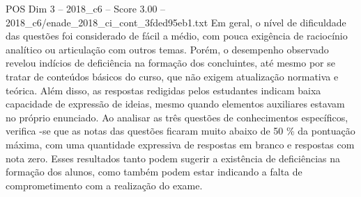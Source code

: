 \begin{textsample}{POS Dim 3 – 2018\_c6 – Score 3.00 – 2018\_c6/enade\_2018\_ci\_cont\_3fded95eb1.txt}
Em geral, o nível de dificuldade das questões foi considerado de fácil a médio, com pouca exigência de raciocínio analítico ou articulação com outros temas.
Porém, o desempenho observado revelou indícios de deficiência na formação dos concluintes, até mesmo por se tratar de conteúdos básicos do curso, que não exigem atualização normativa e teórica.
Além disso, as respostas redigidas pelos estudantes indicam baixa capacidade de expressão de ideias, mesmo quando elementos auxiliares estavam no próprio enunciado.
Ao analisar as três questões de conhecimentos específicos, verifica -se que as notas das questões ficaram muito abaixo de 50 \% da pontuação máxima, com uma quantidade expressiva de respostas em branco e respostas com nota zero.
Esses resultados tanto podem sugerir a existência de deficiências na formação dos alunos, como também podem estar indicando a falta de comprometimento com a realização do exame.

\end{textsample}
